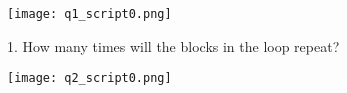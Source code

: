 \begin{center}
\texttt{[image: q1\_script0.png]}
\end{center}
1. How many times will the blocks in the loop repeat?
\numbox \\

\noindent \dotfill
\begin{center}
\texttt{[image: q2\_script0.png]}
\end{center}
